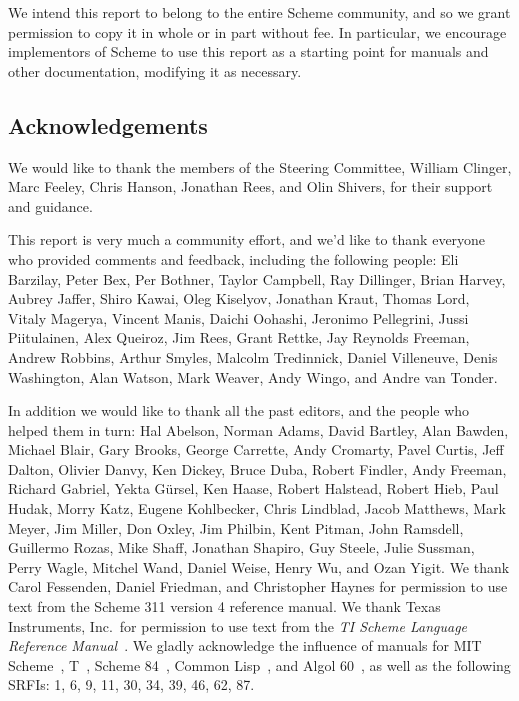 \medskip

We intend this report to belong to the entire Scheme community, and so
we grant permission to copy it in whole or in part without fee.  In
particular, we encourage implementors of Scheme to use this report as
a starting point for manuals and other documentation, modifying it as
necessary.




\subsection*{Acknowledgements}

We would like to thank the members of the Steering Committee, William
Clinger, Marc Feeley, Chris Hanson, Jonathan Rees, and Olin Shivers, for
their support and guidance.

This report is very much a community effort, and we'd like to thank
everyone who provided comments and feedback, including the following people:
Eli Barzilay, Peter Bex, Per Bothner, Taylor Campbell, Ray Dillinger,
Brian Harvey, Aubrey Jaffer, Shiro Kawai, Oleg Kiselyov, Jonathan
Kraut, Thomas Lord, Vitaly Magerya, Vincent Manis, Daichi Oohashi,
Jeronimo Pellegrini, Jussi Piitulainen, Alex Queiroz, Jim Rees, Grant
Rettke, Jay Reynolds Freeman, Andrew Robbins, Arthur Smyles, Malcolm
Tredinnick, Daniel Villeneuve, Denis Washington, Alan Watson, Mark
Weaver, Andy Wingo, and Andre van Tonder.

In addition we would like to thank all the past editors, and the
people who helped them in turn: Hal Abelson, Norman Adams, David
Bartley, Alan Bawden, Michael Blair, Gary Brooks, George Carrette,
Andy Cromarty, Pavel Curtis, Jeff Dalton, Olivier Danvy, Ken Dickey,
Bruce Duba, Robert Findler, Andy Freeman, Richard Gabriel, Yekta
G\"ursel, Ken Haase, Robert Halstead, Robert Hieb, Paul Hudak, Morry
Katz, Eugene Kohlbecker, Chris Lindblad, Jacob Matthews, Mark Meyer,
Jim Miller, Don Oxley, Jim Philbin, Kent Pitman, John Ramsdell,
Guillermo Rozas, Mike Shaff, Jonathan Shapiro, Guy Steele, Julie
Sussman, Perry Wagle, Mitchel Wand, Daniel Weise, Henry Wu, and Ozan
Yigit.  We thank Carol Fessenden, Daniel Friedman, and Christopher
Haynes for permission to use text from the Scheme 311 version 4
reference manual.  We thank Texas Instruments, Inc.~for permission to
use text from the {\em TI Scheme Language Reference
Manual}~\cite{TImanual85}.  We gladly acknowledge the influence of
manuals for MIT Scheme~\cite{MITScheme}, T~\cite{Rees84}, Scheme
84~\cite{Scheme84}, Common Lisp~\cite{CLtL}, and Algol 60~\cite{Naur63},
as well as the following SRFIs:  1, 6, 9, 11, 30, 34, 39, 46, 62, 87.

